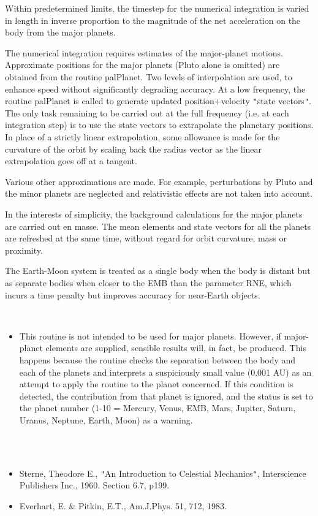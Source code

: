 \documentclass[twoside,11pt]{article}
\renewcommand{\_}{\texttt{\symbol{95}}}
\newcommand{\sstdiytopic}[2]{\item[{\hspace{-0.35em}#1\hspace{-0.35em}:}]
\mbox{} \\[1.3ex] #2}
\newcommand{\sstitemlist}[1]{
  \mbox{} \\
  \vspace{-3.5ex}
  \begin{itemize}
     #1
  \end{itemize}
}
\newcommand{\sstitem}{\item}
\newcommand{\sstdiytopic}[2]{\item[{#1}] #2 }
\newcommand{\sstitemlist}[1]{
      \begin{itemize}
         #1
      \end{itemize}
      \\
   }
\newcommand{\sstitem}{\item}
\begin{document}
{{        Within predetermined limits, the timestep for the numerical
        integration is varied in length in inverse proportion to the
        magnitude of the net acceleration on the body from the major
        planets.

        The numerical integration requires estimates of the major-planet
        motions.  Approximate positions for the major planets (Pluto
        alone is omitted) are obtained from the routine palPlanet.  Two
        levels of interpolation are used, to enhance speed without
        significantly degrading accuracy.  At a low frequency, the routine
        palPlanet is called to generate updated position$+$velocity {\tt "}state
        vectors{\tt "}.  The only task remaining to be carried out at the full
        frequency (i.e. at each integration step) is to use the state
        vectors to extrapolate the planetary positions.  In place of a
        strictly linear extrapolation, some allowance is made for the
        curvature of the orbit by scaling back the radius vector as the
        linear extrapolation goes off at a tangent.

        Various other approximations are made.  For example, perturbations
        by Pluto and the minor planets are neglected and relativistic
        effects are not taken into account.

        In the interests of simplicity, the background calculations for
        the major planets are carried out en masse.  The mean elements and
        state vectors for all the planets are refreshed at the same time,
        without regard for orbit curvature, mass or proximity.

        The Earth-Moon system is treated as a single body when the body is
        distant but as separate bodies when closer to the EMB than the
        parameter RNE, which incurs a time penalty but improves accuracy
        for near-Earth objects.

      \sstitemlist{

         \sstitem
         This routine is not intended to be used for major planets.
           However, if major-planet elements are supplied, sensible results
           will, in fact, be produced.  This happens because the routine
           checks the separation between the body and each of the planets and
           interprets a suspiciously small value (0.001 AU) as an attempt to
           apply the routine to the planet concerned.  If this condition is
           detected, the contribution from that planet is ignored, and the
           status is set to the planet number (1-10 = Mercury, Venus, EMB,
           Mars, Jupiter, Saturn, Uranus, Neptune, Earth, Moon) as a warning.
      }
   }
   \sstdiytopic{
      See Also
   }{
      \sstitemlist{

         \sstitem
         Sterne, Theodore E., {\tt "}An Introduction to Celestial Mechanics{\tt "},
           Interscience Publishers Inc., 1960.  Section 6.7, p199.

         \sstitem
         Everhart, E. \& Pitkin, E.T., Am.J.Phys. 51, 712, 1983.
      }
   }
}
\end{document}
